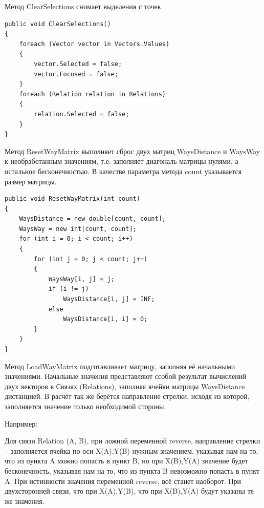 \documentclass[a4paper,14pt, Times New Roman]{extarticle}
\begin{document}
Метод ClearSelections снимает выделения с точек.

\begin{lstlisting}
public void ClearSelections()
{
    foreach (Vector vector in Vectors.Values)
    {
        vector.Selected = false;
        vector.Focused = false;
    }
    foreach (Relation relation in Relations)
    {
        relation.Selected = false;
    }
}
\end{lstlisting}

Метод ResetWayMatrix выполняет сброс двух матриц WaysDistance и WaysWay к необработанным значениям, т.е. заполняет диагональ матрицы нулями, а остальное бесконечностью. В качестве параметра метода count указывается размер матрицы.

\begin{lstlisting}
public void ResetWayMatrix(int count)
{
    WaysDistance = new double[count, count];
    WaysWay = new int[count, count];
    for (int i = 0; i < count; i++)
    {
        for (int j = 0; j < count; j++)
        {
            WaysWay[i, j] = j;
            if (i != j)
                WaysDistance[i, j] = INF;
            else
                WaysDistance[i, i] = 0;
        }
    }
}
\end{lstlisting}

Метод LoadWayMatrix подготавливает матрицу, заполняя её начальными значениями. Начальные значения представляют ссобой результат вычислений двух векторов в Связях (Relations), заполняя ячейки матрицы WaysDistance дистанцией. В расчёт так же берётся направление стрелки, исходя из которой, заполняется значение только необходимой стороны.

Например:

Для связи Relation (A, B), при ложной переменной reverse, направление стрелки – заполняется ячейка по оси X(A),Y(B) нужным значением, указывая нам на то, что из пункта A можно попасть в пункт B, но при X(B),Y(A) значение будет бесконечность, указывая нам на то, что из пункта B невозможно попасть в пункт A. При истинности значения переменной reverse, всё станет наоборот. При двухсторонней связи, что при X(A),Y(B), что при X(B),Y(A) будут указаны те же значения.
\end{document}
